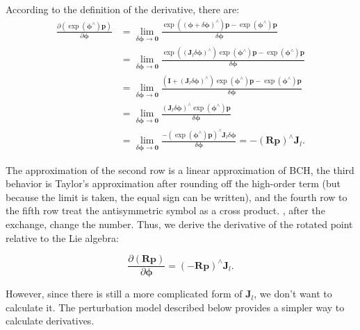 According to the definition of the derivative, there are:
\begin{align*}
\frac{{\partial \left( {\exp \left( {{ \boldsymbol{\phi} ^ \wedge }} \right) \bm{p}} \right)}}{{\partial \boldsymbol{\phi} }} &= \mathop {\lim }\limits_{\delta \boldsymbol{\phi}  \to \bm{0}} \frac{{\exp \left( {{{\left( {\boldsymbol{\phi}  + \delta \boldsymbol{\phi} } \right)}^ \wedge }} \right) \bm{p} - \exp \left( {{\boldsymbol{\phi} ^ \wedge }} \right)\bm{p}}}{{\delta \boldsymbol{\phi} }}\\
& = \mathop {\lim }\limits_{\delta \boldsymbol{\phi}  \to \bm{0}} \frac{{\exp \left( {{{\left( {{\bm{J}_l}\delta \boldsymbol{\phi} } \right)}^ \wedge }} \right)\exp \left( {{\boldsymbol{\phi} ^ \wedge }} \right) \bm{p} - \exp \left( {{\boldsymbol{\phi} ^ \wedge }} \right) \bm{p}}}{{\delta \boldsymbol{\phi} }}\\
&= \mathop {\lim }\limits_{\delta \boldsymbol{\phi}  \to \bm{0}} \frac{{\left( { \bm{I} + {{\left( {{ \bm{J}_l}\delta \boldsymbol{\phi} } \right)}^ \wedge }} \right)\exp \left( {{\boldsymbol{\phi} ^ \wedge }} \right) \bm{p} - \exp \left( {{\boldsymbol{\phi} ^ \wedge }} \right)\bm{p}}}{{\delta \boldsymbol{\phi} }}\\
&= \mathop {\lim }\limits_{\delta \boldsymbol{\phi}  \to \bm{0}} \frac{{{{\left( {{\bm{J}_l}\delta \boldsymbol{\phi} } \right)}^ \wedge }\exp \left( {{\boldsymbol{\phi} ^ \wedge }} \right)\bm{p}}}{{\delta \boldsymbol{\phi} }}\\
&= \mathop {\lim }\limits_{\delta \boldsymbol{\phi}  \to \bm{0}} \frac{{ - {{\left( {\exp \left( {{\boldsymbol{\phi} ^ \wedge }} \right)\bm{p}} \right)}^ \wedge }{\bm{J}_l}\delta \boldsymbol{\phi} }}{{\delta \boldsymbol{\phi}}} =  - {\left( {\bm{Rp}} \right)^ \wedge }{\bm{J}_l}.
\end{align*}

The approximation of the second row is a linear approximation of BCH, the third behavior is Taylor's approximation after rounding off the high-order term (but because the limit is taken, the equal sign can be written), and the fourth row to the fifth row treat the antisymmetric symbol as a cross product. , after the exchange, change the number. Thus, we derive the derivative of the rotated point relative to the Lie algebra:

\begin{equation}
\frac{{\partial \left( { \bm{Rp}} \right)}}{{\partial \boldsymbol{\phi} }} = {\left( { - \bm{Rp}} \right)^ \wedge }{\bm{J}_l}.
\end{equation}

However, since there is still a more complicated form of $\bm{J}_l$, we don't want to calculate it. The perturbation model described below provides a simpler way to calculate derivatives.
